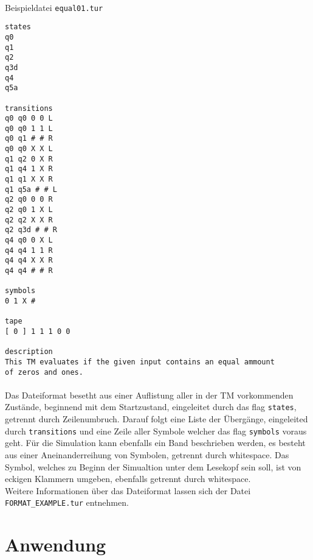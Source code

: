 \documentclass[10pt, a4paper]{article}
\newcommand{\ilc}{\texttt}
\begin{document}
\paragraph*{}
\begin{center}
Beispieldatei \texttt{equal01.tur}
\end{center}
\begin{tiny}
\begin{tcolorbox}
\begin{verbatim}
states
q0
q1
q2
q3d
q4
q5a

transitions
q0 q0 0 0 L
q0 q0 1 1 L
q0 q1 # # R
q0 q0 X X L
q1 q2 0 X R
q1 q4 1 X R
q1 q1 X X R
q1 q5a # # L
q2 q0 0 0 R
q2 q0 1 X L
q2 q2 X X R
q2 q3d # # R
q4 q0 0 X L
q4 q4 1 1 R
q4 q4 X X R
q4 q4 # # R

symbols
0 1 X #

tape
[ 0 ] 1 1 1 0 0

description
This TM evaluates if the given input contains an equal ammount
of zeros and ones. 
\end{verbatim}
\end{tcolorbox}
\end{tiny}
\par

\paragraph*{}
Das Dateiformat besetht aus einer Auflistung aller in der TM vorkommenden Zustände, beginnend mit dem Startzustand, eingeleitet durch das flag \ilc{states}, getrennt durch Zeilenumbruch. Darauf folgt eine Liste der Übergänge, eingeleited durch \ilc{transitions} und eine Zeile aller Symbole welcher das flag \ilc{symbols} voraus geht. Für die Simulation kann ebenfalls ein Band beschrieben werden, es besteht aus einer Aneinanderreihung von Symbolen, getrennt durch whitespace. Das Symbol, welches zu Beginn der Simualtion unter dem Lesekopf sein soll, ist von eckigen Klammern umgeben, ebenfalls getrennt durch whitespace.\\
Weitere Informationen über das Dateiformat lassen sich der Datei \ilc{FORMAT\_EXAMPLE.tur} entnehmen.\par

\section*{Anwendung}
\end{document}
